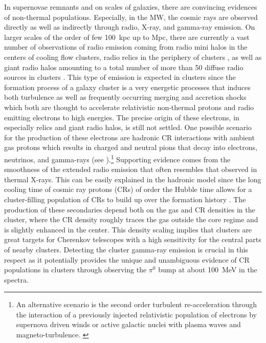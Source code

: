 \documentclass[10pt,aps,pra,reprint,amsmath,amsfonts,amssymb,showpacs,nofootinbib,floatfix]{revtex4-1}
\begin{document}
In supernovae remnants and on scales of galaxies, there are convincing evidences
of non-thermal populations. Especially, in the MW, the cosmic rays are observed
directly as well as indirectly through radio, X-ray, and gamma-ray emission. On
larger scales of the order of few 100~kpc up to Mpc, there are currently a vast
number of observations of radio emission coming from radio mini halos in the
centers of cooling flow clusters, radio relics in the periphery of clusters
\cite{2004rcfg.proc..335K}, as well as giant radio halos amounting to a total
number of more than 50 diffuse radio sources in clusters
\cite{2003ASPC..301..143F,2008SSRv..134...93F}. This type of emission is
expected in clusters since the formation process of a galaxy cluster is a very
energetic processes that induces both turbulence as well as frequently occurring
merging and accretion shocks which both are thought to accelerate relativistic
non-thermal protons and radio emitting electrons to high energies. The precise
origin of these electrons, in especially relics and giant radio halos, is still
not settled. One possible scenario for the production of these electrons are
hadronic CR interactions with ambient gas protons which results in charged and
neutral pions that decay into electrons, neutrinos, and gamma-rays (see
\cite{1980ApJ...239L..93D,1982AJ.....87.1266V,1999APh....12..169B,2000A&A...362..151D,2001ApJ...559...59M,2003MNRAS.342.1009M,2004A&A...413...17P,2004MNRAS.352...76P,2008MNRAS.385.1211P,2008MNRAS.385.1242P,2009JCAP...09..024K,2010MNRAS.401...47D,2010MNRAS.407.1565D,2010ApJ...722..737K,2011A&A...527A..99E}
).\footnote{An alternative scenario is the second order turbulent
  re-acceleration through the interaction of a previously injected relativistic
  population of electrons by supernova driven winds or active galactic nuclei
  with plasma waves and magneto-turbulence. \protect
  \cite{1987A&A...182...21S,1993ApJ...406..399G,2004MNRAS.350.1174B,2005MNRAS.363.1173B,2007MNRAS.378..245B,2011MNRAS.410..127B,2009A&A...507..661B}}
Supporting evidence comes from the smoothness of the extended radio emission
that often resembles that observed in thermal X-rays. This can be easily
explained in the hadronic model since the long cooling time of cosmic ray
protons (CRs) of order the Hubble time allows for a cluster-filling population
of CRs to build up over the formation history \cite{1996SSRv...75..279V,
  1997ApJ...477..560E, 1997ApJ...487..529B}. The production of these secondaries
depend both on the gas and CR densities in the cluster, where the CR density
roughly traces the gas outside the core regime and is slightly enhanced in the
center. This density scaling implies that clusters are great targets for
Cherenkov telescopes with a high sensitivity for the central parts of nearby
clusters. Detecting the cluster gamma-ray emission is crucial in this respect as
it potentially provides the unique and unambiguous evidence of CR populations in
clusters through observing the $\pi^0$ bump at about 100~MeV in the spectra.
\end{document}
